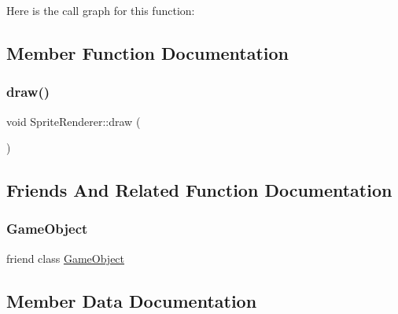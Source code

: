 Here is the call graph for this function\+:


\subsection{Member Function Documentation}
\hypertarget{class_mason_1_1_sprite_renderer_aeeeaa7eb5c340b7c2abad3d4785fd1e1}{}\label{class_mason_1_1_sprite_renderer_aeeeaa7eb5c340b7c2abad3d4785fd1e1} 
\subsubsection{\texorpdfstring{draw()}{draw()}}
{\footnotesize\ttfamily void Sprite\+Renderer\+::draw (\begin{DoxyParamCaption}{ }\end{DoxyParamCaption})}



\subsection{Friends And Related Function Documentation}
\hypertarget{class_mason_1_1_sprite_renderer_a00df87c957d8f7ee0fc51f07a0542f4a}{}\label{class_mason_1_1_sprite_renderer_a00df87c957d8f7ee0fc51f07a0542f4a} 
\subsubsection{\texorpdfstring{Game\+Object}{GameObject}}
{\footnotesize\ttfamily friend class \hyperlink{class_mason_1_1_game_object}{Game\+Object}\hspace{0.3cm}{\ttfamily [friend]}}



\subsection{Member Data Documentation}
\hypertarget{class_mason_1_1_sprite_renderer_a17a9d82d45d7ae1058542e5c939122c6}{}\label{class_mason_1_1_sprite_renderer_a17a9d82d45d7ae1058542e5c939122c6} 
